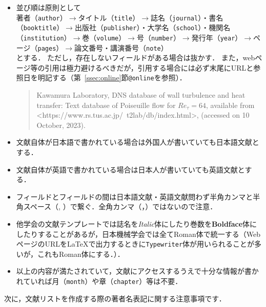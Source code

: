 \documentclass[a4paper,fleqn,uplatex,dvipdfmx]{jsarticle}
\makeatletter
\newcommand{\ttonline}{\texttt{@online}}
\makeatother
\begin{document}
\begin{itembox}[l]{}
    \begin{itemize}
        \item 並び順は原則として \\
            著者（\verb|author|）$\to$タイトル（\verb|title|）$\to$誌名（\verb|journal|）・書名（\verb|booktitle|）$\to$出版社（\verb|publisher|）・大学名（\verb|school|）・機関名（\verb|institution|）$\to$巻（\verb|volume|）$\to$号（\verb|number|）$\to$発行年（\verb|year|）$\to$ページ（\verb|pages|）$\to$論文番号・講演番号（\verb|note|） \\
            とする．
            ただし，存在しないフィールドがある場合は抜かす．
            また，webページ等の引用は極力避けるべきだが，引用する場合には必ず末尾にURLと参照日を明記する（第~\ref{ssec:online}節\ttonline を参照）．
            \begin{quote}
                Kawamura Laboratory, DNS database of wall turbulence and heat transfer: Text database of Poiseuille flow for $\mathit{Re}_\tau = 64$, available from \textless https://www.rs.tus.ac.jp/~t2lab/db/index.html\textgreater, (accessed on 10 October, 2023).
            \end{quote}
        \item 文献自体が日本語で書かれている場合は外国人が書いていても日本語文献とする．
        \item 文献自体が英語で書かれている場合は日本人が書いていても英語文献とする．
        \item フィールドとフィールドの間は日本語文献・英語文献問わず半角カンマと半角スペース（, ）で繋ぐ．全角カンマ（，）ではないので注意．
        \item 他学会の文献テンプレートでは誌名を\textit{Italic}体にしたり巻数を\textbf{Boldface}体にしたりすることがあるが，日本機械学会では全て\textrm{Roman}体で統一する（WebページのURLを\LaTeX{}で出力するときに\texttt{Typewriter}体が用いられることが多いが，これも\textrm{Roman}体にする．）．
        \item 以上の内容が満たされていて，文献にアクセスするうえで十分な情報が書かれていれば月（\verb|month|）や章（\verb|chapter|）等は不要．
    \end{itemize}
\end{itembox}
次に，文献リストを作成する際の著者名表記に関する注意事項です．
\end{document}
